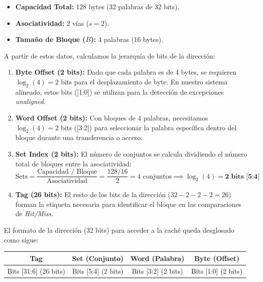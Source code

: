 \documentclass[12pt,a4paper]{article}
\begin{document}
\begin{itemize}[label=\small\color{blue!70!black}\textbullet]
    \item \textbf{Capacidad Total:} 128 bytes (32 palabras de 32 bits).
    \item \textbf{Asociatividad:} 2 vías ($s=2$).
    \item \textbf{Tamaño de Bloque ($B$):} 4 palabras (16 bytes).
\end{itemize}

A partir de estos datos, calculamos la jerarquía de bits de la dirección:

\begin{enumerate}
    \item \textbf{Byte Offset (2 bits):} Dado que cada palabra es de 4 bytes, se requieren $\log_2(4) = 2$ bits para el desplazamiento de byte. En nuestro sistema alineado, estos bits ([1:0]) se utilizan para la detección de excepciones \textit{unaligned}.
    \item \textbf{Word Offset (2 bits):} Con bloques de 4 palabras, necesitamos $\log_2(4) = 2$ bits ([3:2]) para seleccionar la palabra específica dentro del bloque durante una transferencia o acceso.
    \item \textbf{Set Index (2 bits):} El número de conjuntos se calcula dividiendo el número total de bloques entre la asociatividad:
    \begin{equation*}
        \text{Sets} = \frac{\text{Capacidad / Bloque}}{\text{Asociatividad}} = \frac{128 / 16}{2} = 4 \text{ conjuntos} \implies \log_2(4) = \mathbf{2 \text{ bits [5:4]}}
    \end{equation*}
    \item \textbf{Tag (26 bits):} El resto de los bits de la dirección ($32 - 2 - 2 - 2 = 26$) forman la etiqueta necesaria para identificar el bloque en las comparaciones de \textit{Hit/Miss}.
\end{enumerate}

\newpage
    El formato de la dirección (32 bits) para acceder a la caché queda desglosado como sigue:
    \begin{center}
    \begin{tabular}{|c|c|c|c|}
    \hline
    \textbf{Tag} & \textbf{Set (Conjunto)} & \textbf{Word (Palabra)} & \textbf{Byte (Offset)} \\
    \hline
    Bits [31:6] (26 bits) & Bits [5:4] (2 bits) & Bits [3:2] (2 bits) & Bits [1:0] (2 bits) \\
    \hline
    \end{tabular}
    \end{center}
\end{document}
